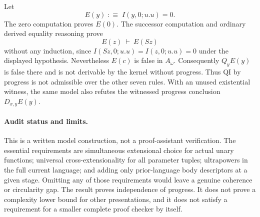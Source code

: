 Let
\[
                          E(y)\;:\equiv\;I(y,0;u.u)=0.
\]
The zero computation proves $E(0)$. The successor computation and ordinary
derived equality reasoning prove
\[
                          E(z)\ \vdash\ E(Sz)
\]
without any induction, since
$I(Sz,0;u.u)=I(z,0;u.u)=0$ under the displayed hypothesis.
Nevertheless $E(c)$ is false in $A_\omega$. Consequently $Q_yE(y)$ is
false there and is not derivable by the kernel without progress.
Thus QI by progress is not admissible over the other seven rules.
With an unused existential witness, the same model also refutes the
witnessed progress conclusion $D_{x,y}E(y)$.

\paragraph{Audit status and limits.}
This is a written model construction, not a proof-assistant verification.
The essential requirements are simultaneous extensional choice for actual
unary functions; universal cross-extensionality for all parameter tuples;
ultrapowers in the full current language; and adding only prior-language
body descriptors at a given stage. Omitting any of those requirements would
leave a genuine coherence or circularity gap. The result proves independence
of progress. It does not prove a complexity lower bound for other
presentations, and it does not satisfy a requirement for a smaller complete
proof checker by itself.
